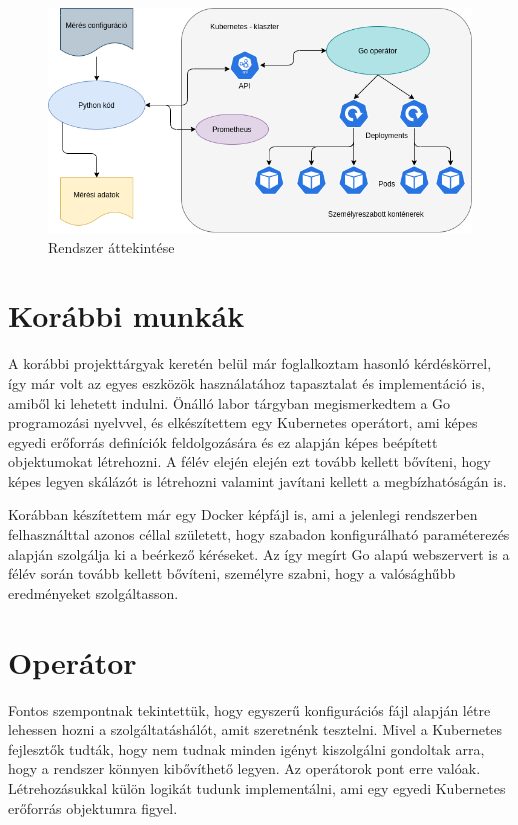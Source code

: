 \begin{figure}[!ht]
\centering
\includegraphics[width=150mm, keepaspectratio]{figures/system_overview.png}
\caption{Rendszer áttekintése}
\label{fig:system_overview}
\end{figure}

\section{Korábbi munkák}
A korábbi projekttárgyak keretén belül már foglalkoztam hasonló kérdéskörrel, így már volt az egyes eszközök használatához tapasztalat és implementáció is, amiből ki lehetett indulni. 
Önálló labor tárgyban megismerkedtem a Go programozási nyelvvel, és elkészítettem egy Kubernetes operátort, ami képes egyedi erőforrás definíciók feldolgozására és ez alapján képes beépített objektumokat létrehozni. A félév elején elején ezt tovább kellett bővíteni, hogy képes legyen skálázót is létrehozni valamint javítani kellett a megbízhatóságán is.

Korábban készítettem már egy Docker képfájl is, ami a jelenlegi rendszerben felhasználttal azonos céllal született, hogy szabadon konfigurálható paraméterezés alapján szolgálja ki a beérkező kéréseket. Az így megírt Go alapú webszervert is a félév során tovább kellett bővíteni, személyre szabni, hogy a valósághűbb eredményeket szolgáltasson.

\section{Operátor}
Fontos szempontnak tekintettük, hogy egyszerű konfigurációs fájl alapján létre lehessen hozni a szolgáltatáshálót, amit szeretnénk tesztelni. 
Mivel a Kubernetes fejlesztők tudták, hogy nem tudnak minden igényt kiszolgálni gondoltak arra, hogy a rendszer könnyen kibővíthető legyen. Az operátorok pont erre valóak. Létrehozásukkal külön logikát tudunk implementálni, ami egy egyedi Kubernetes erőforrás objektumra figyel. 


